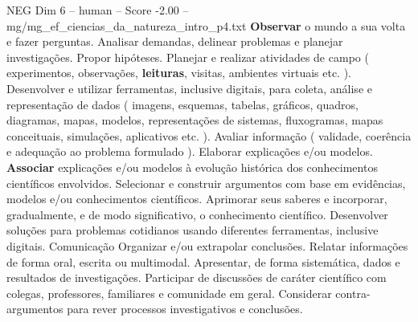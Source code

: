 \begin{textsample}{NEG Dim 6 – human – Score -2.00 – mg/mg\_ef\_ciencias\_da\_natureza\_intro\_p4.txt}  \label{ex:f6_neg_017}
\textbf{Observar} o mundo a sua volta e fazer perguntas.
Analisar demandas, delinear problemas e planejar investigações.
Propor hipóteses.
Planejar e realizar atividades de campo ( experimentos, observações, \textbf{leituras}, visitas, ambientes virtuais etc. ).
Desenvolver e utilizar ferramentas, inclusive digitais, para coleta, análise e representação de dados ( imagens, esquemas, tabelas, gráficos, quadros, diagramas, mapas, modelos, representações de sistemas, fluxogramas, mapas conceituais, simulações, aplicativos etc. ).
Avaliar informação ( validade, coerência e adequação ao problema formulado ).
Elaborar explicações e/ou modelos. \textbf{Associar} explicações e/ou modelos à evolução histórica dos conhecimentos científicos envolvidos.
Selecionar e construir argumentos com base em evidências, modelos e/ou conhecimentos científicos.
Aprimorar seus saberes e incorporar, gradualmente, e de modo significativo, o conhecimento científico.
Desenvolver soluções para problemas cotidianos usando diferentes ferramentas, inclusive digitais.
Comunicação Organizar e/ou extrapolar conclusões.
Relatar informações de forma oral, escrita ou multimodal.
Apresentar, de forma sistemática, dados e resultados de investigações.
Participar de discussões de caráter científico com colegas, professores, familiares e comunidade em geral.
Considerar contra-argumentos para rever processos investigativos e conclusões.

\end{textsample}

